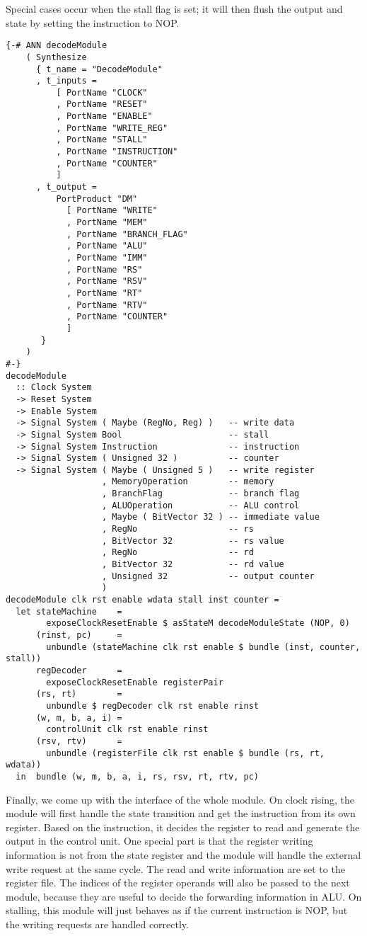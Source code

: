 Special cases occur when the stall flag is set; it will then flush the output and state by setting the instruction to NOP.
\begin{verbatim}
{-# ANN decodeModule
    ( Synthesize
      { t_name = "DecodeModule"
      , t_inputs =
          [ PortName "CLOCK"
          , PortName "RESET"
          , PortName "ENABLE"
          , PortName "WRITE_REG"
          , PortName "STALL"
          , PortName "INSTRUCTION"
          , PortName "COUNTER"
          ]
      , t_output =
          PortProduct "DM"
            [ PortName "WRITE"
            , PortName "MEM"
            , PortName "BRANCH_FLAG"
            , PortName "ALU"
            , PortName "IMM"
            , PortName "RS"
            , PortName "RSV"
            , PortName "RT"
            , PortName "RTV"
            , PortName "COUNTER"
            ]
       }
    )
#-}
decodeModule 
  :: Clock System
  -> Reset System
  -> Enable System
  -> Signal System ( Maybe (RegNo, Reg) )   -- write data
  -> Signal System Bool                     -- stall
  -> Signal System Instruction              -- instruction
  -> Signal System ( Unsigned 32 )          -- counter
  -> Signal System ( Maybe ( Unsigned 5 )   -- write register
                   , MemoryOperation        -- memory
                   , BranchFlag             -- branch flag
                   , ALUOperation           -- ALU control
                   , Maybe ( BitVector 32 ) -- immediate value
                   , RegNo                  -- rs
                   , BitVector 32           -- rs value
                   , RegNo                  -- rd
                   , BitVector 32           -- rd value
                   , Unsigned 32            -- output counter
                   )
decodeModule clk rst enable wdata stall inst counter =
  let stateMachine    =
        exposeClockResetEnable $ asStateM decodeModuleState (NOP, 0)
      (rinst, pc)     =
        unbundle (stateMachine clk rst enable $ bundle (inst, counter, stall))
      regDecoder      = 
        exposeClockResetEnable registerPair
      (rs, rt)        = 
        unbundle $ regDecoder clk rst enable rinst
      (w, m, b, a, i) = 
        controlUnit clk rst enable rinst
      (rsv, rtv)      =
        unbundle (registerFile clk rst enable $ bundle (rs, rt, wdata))
  in  bundle (w, m, b, a, i, rs, rsv, rt, rtv, pc)
\end{verbatim}
Finally, we come up with the interface of the whole module. On clock rising, the module will first handle the state transition and get the instruction from its own register. Based on the instruction, it decides the register to read and generate the output in the control unit. One special part is that the register writing information is not from the state register and the module will handle the external write request at the same cycle. The read and write information are set to the register file. The indices of the register operands will also be passed to the next module, because they are useful to decide the forwarding information in ALU. On stalling, this module will just behaves as if the current instruction is NOP, but the writing requests are handled correctly.
